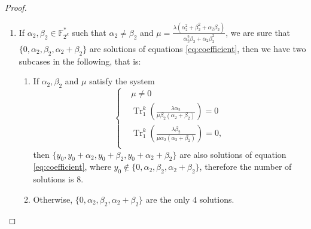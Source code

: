 \documentclass{article}
\newcommand{\F}{\mathbb{F}}
\newcommand{\0}{\textbf{0}}
\newcommand{\1}{\textbf{1}}
\newcommand{\TRACE}{\operatorname{Tr}_1^k}
\theoremstyle{plain}
\theoremstyle{nonumberplain}
\begin{document}
\begin{proof}
\begin{enumerate}[label=\textbf{Case \arabic*}]
        \item 
    If $ \alpha_2,\beta_2\in\F_{2^k}^* $ such that $ \alpha_2\ne\beta_2 $ and   
    $ \mu= \frac{\lambda(\alpha_2^2+\beta_2^2+\alpha_2\beta_2)}{\alpha_2^2\beta_2+\alpha_2\beta_2^2}$, 
    we are sure that $ \{0,\alpha_2,\beta_2,\alpha_2+\beta_2\} $ are solutions of equations \eqref{eq:coefficient}, 
    then we have two subcases in the following, that is: 
    \begin{enumerate}[label=\arabic{*})]
        \item If $ \alpha_2,\beta_2 $ and $ \mu $ satisfy the system 
        \begin{equation}\label{eq:last_four_solution_condition}\left\{
            \begin{alignedat}{3}
                &\mu\ne 0\\
                &\TRACE\left(\frac{\lambda\alpha_2}{\mu\beta_2(\alpha_2+\beta_2)}\right)=0\\
                &\TRACE\left(\frac{\lambda\beta_2}{\mu\alpha_2(\alpha_2+\beta_2)}\right)=0,\\
            \end{alignedat}\right.
        \end{equation}
        then $ \{y_0,y_0+\alpha_2,y_0+\beta_2,y_0+\alpha_2+\beta_2\} $ are also solutions of equation \eqref{eq:coefficient}, 
        where $ y_0\notin\{0,\alpha_2,\beta_2,\alpha_2+\beta_2\} $, 
        therefore the number of solutions is $ 8 $.
        \item Otherwise, $ \{0,\alpha_2,\beta_2,\alpha_2+\beta_2\} $ are the only $ 4 $ solutions. 
    \end{enumerate}



\end{enumerate}
\end{proof}
\end{document}
